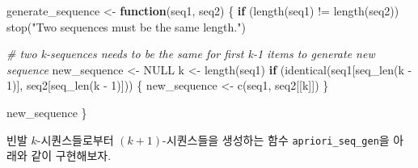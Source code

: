 \documentclass[
]{book}
\newenvironment{Shaded}{\begin{snugshade}}{\end{snugshade}}
\newcommand{\CommentTok}[1]{\textcolor[rgb]{0.56,0.35,0.01}{\textit{#1}}}
\newcommand{\ConstantTok}[1]{\textcolor[rgb]{0.00,0.00,0.00}{#1}}
\newcommand{\ControlFlowTok}[1]{\textcolor[rgb]{0.13,0.29,0.53}{\textbf{#1}}}
\newcommand{\DecValTok}[1]{\textcolor[rgb]{0.00,0.00,0.81}{#1}}
\newcommand{\FunctionTok}[1]{\textcolor[rgb]{0.00,0.00,0.00}{#1}}
\newcommand{\NormalTok}[1]{#1}
\newcommand{\OtherTok}[1]{\textcolor[rgb]{0.56,0.35,0.01}{#1}}
\newcommand{\SpecialCharTok}[1]{\textcolor[rgb]{0.00,0.00,0.00}{#1}}
\newcommand{\StringTok}[1]{\textcolor[rgb]{0.31,0.60,0.02}{#1}}
\begin{document}
\begin{Shaded}
\begin{Highlighting}[]
\NormalTok{generate\_sequence }\OtherTok{\textless{}{-}} \ControlFlowTok{function}\NormalTok{(seq1, seq2) \{}
  \ControlFlowTok{if}\NormalTok{ (}\FunctionTok{length}\NormalTok{(seq1) }\SpecialCharTok{!=} \FunctionTok{length}\NormalTok{(seq2)) }\FunctionTok{stop}\NormalTok{(}\StringTok{"Two sequences must be the same length."}\NormalTok{)}
  
  \CommentTok{\# two k{-}sequences needs to be the same for first k{-}1 items to generate new sequence}
\NormalTok{  new\_sequence }\OtherTok{\textless{}{-}} \ConstantTok{NULL}
\NormalTok{  k }\OtherTok{\textless{}{-}} \FunctionTok{length}\NormalTok{(seq1)}
  \ControlFlowTok{if}\NormalTok{ (}\FunctionTok{identical}\NormalTok{(seq1[}\FunctionTok{seq\_len}\NormalTok{(k }\SpecialCharTok{{-}} \DecValTok{1}\NormalTok{)], seq2[}\FunctionTok{seq\_len}\NormalTok{(k }\SpecialCharTok{{-}} \DecValTok{1}\NormalTok{)])) \{}
\NormalTok{    new\_sequence }\OtherTok{\textless{}{-}} \FunctionTok{c}\NormalTok{(seq1, seq2[[k]])}
\NormalTok{  \}}
  
\NormalTok{  new\_sequence}
\NormalTok{\}}
\end{Highlighting}
\end{Shaded}

빈발 \(k\)-시퀀스들로부터 \((k+1)\)-시퀀스들을 생성하는 함수 \texttt{apriori\_seq\_gen}을 아래와 같이 구현해보자.
\end{document}
